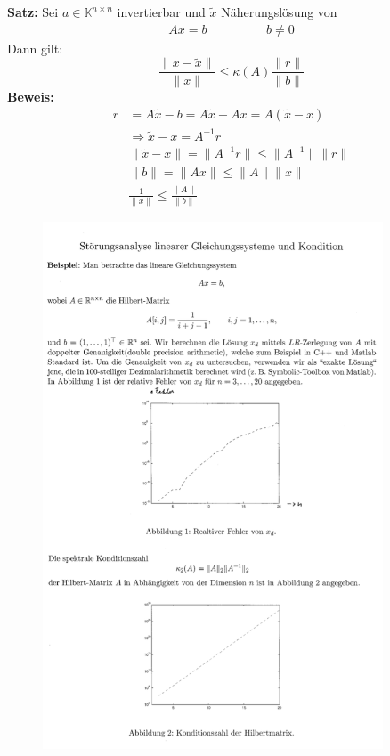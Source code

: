 \textbf{Satz:}
Sei $a \in \mathbb{K}^{n \times n}$ invertierbar und $\widetilde{x}$ Näherungslösung von
\begin{equation*}
\begin{aligned}
Ax = b \hspace{2cm} b \neq 0
\end{aligned}
\end{equation*}
Dann gilt:
\begin{equation*}
\frac{\|x - \widetilde{x}\|}{\|x\|} \leq \kappa\left(A\right) \frac{\|r\|}{\|b\|}
\end{equation*}
\textbf{Beweis:}
\begin{equation*}
\begin{aligned}
r &= A\widetilde{x} - b = A\widetilde{x} - Ax = A\left(\widetilde{x} - x\right) \\
&\Rightarrow \widetilde{x} - x = A^{-1}r \\
&\|\widetilde{x} - x\| = \|A^{-1}r\| \leq \|A^{-1}\|\|r\| \\
&\|b\| = \|Ax\| \leq \|A\|\|x\| \\
&\frac{1}{\|x\|} \leq \frac{\|A\|}{\|b\|}
\end{aligned}
\end{equation*}

\begin{figure}[htbp]
  \centering
  \includegraphics[width=0.9\textwidth]{figures/stoerungsanalyse_lin_glgns.png}
\end{figure}

